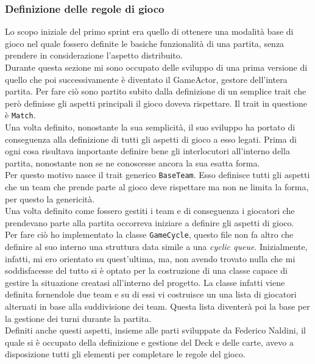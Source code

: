 	\subsubsection{Definizione delle regole di gioco}
	  Lo scopo iniziale del primo sprint era quello di ottenere una modalità base di gioco nel quale fossero definite le basiche funzionalità di una partita, senza prendere in considerazione l'aspetto distribuito.
	  \\
	  Durante questa sezione mi sono occupato delle sviluppo di una prima versione di quello che poi successivamente è diventato il GameActor, gestore dell'intera partita.
	  Per fare ciò sono partito subito dalla definizione di un semplice trait che però definisse gli aspetti principali il gioco doveva rispettare.
	  Il trait in questione è \texttt{Match}.\\
	  Una volta definito, nonostante la sua semplicità, il suo sviluppo ha portato di conseguenza alla definizione di tutti gli aspetti di gioco a esso legati.
	  Prima di ogni cosa risultava importante definire bene gli interlocutori all'interno della partita, nonostante non se ne conoscesse ancora la sua esatta forma. \\
	  Per questo motivo nasce il trait generico \texttt{BaseTeam}. Esso definisce tutti gli aspetti che un team che prende parte al gioco deve rispettare ma non ne limita la forma, per questo la genericità. \\
	  Una volta definito come fossero gestiti i team e di conseguenza i giocatori che prendevano parte alla partita occorreva iniziare a definire gli aspetti di gioco.\\
	  Per fare ciò ho implementato la classe \texttt{GameCycle}, questo file non fa altro che definire al suo interno una struttura data simile a una \textit{cyclic queue}. Inizialmente, infatti, mi ero orientato su quest'ultima, ma, non avendo trovato nulla che mi soddisfacesse del tutto si è optato per la costruzione di una classe capace di gestire la situazione creatasi all'interno del progetto.
	  La classe infatti viene definita fornendole due team e su di essi vi costruisce un una lista di giocatori alternati in base alla suddivisione dei team. Questa lista diventerà poi la base per la gestione dei turni durante la partita.
	  \\
	  Definiti anche questi aspetti, insieme alle parti sviluppate da Federico Naldini, il quale si è occupato della definizione e gestione del Deck e delle carte, avevo a disposizione tutti gli elementi per completare le regole del gioco.
